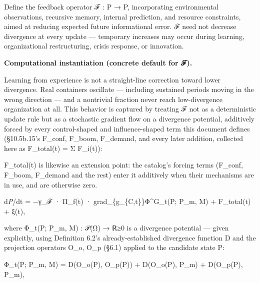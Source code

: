 \documentclass[
]{article}
\begin{document}
Define the feedback operator ℱ : P → P, incorporating environmental
observations, recursive memory, internal prediction, and resource
constraints, aimed at reducing expected future informational error. ℱ
need not decrease divergence at every update --- temporary increases may
occur during learning, organizational restructuring, crisis response, or
innovation.

\textbf{Computational instantiation (concrete default for ℱ).}

Learning from experience is not a straight-line correction toward lower
divergence. Real containers oscillate --- including sustained periods
moving in the wrong direction --- and a nontrivial fraction never reach
low-divergence organization at all. This behavior is captured by
treating ℱ not as a deterministic update rule but as a stochastic
gradient flow on a divergence potential, additively forced by every
control-shaped and influence-shaped term this document defines
(§10.5b.15's F\_conf, F\_boom, F\_demand, and every later addition,
collected here as F\_total(t) = Σ F\_i(t)):

F\_total(t) is likewise an extension point: the catalog's forcing terms
(F\_conf, F\_boom, F\_demand and the rest) enter it additively when
their mechanisms are in use, and are otherwise zero.

d\emph{P}/dt = −γ\_ℱ · Π\_f(t) · grad\_\{g\_\{C,t\}\}Φ\^{}G\_t(P; P\_m,
M) + F\_total(t) + ξ(t),

where Φ\_t(P; P\_m, M) : 𝒫(Ω) → ℝ≥0 is a divergence potential --- given
explicitly, using Definition 6.2's already-established divergence
function D and the projection operators O\_o, O\_p (§6.1) applied to the
candidate state P:

Φ\_t(P; P\_m, M) = D(O\_o(P), O\_p(P)) + D(O\_o(P), P\_m) + D(O\_p(P),
P\_m),
\end{document}
